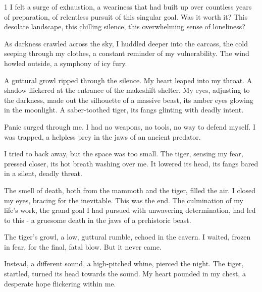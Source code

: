 \documentclass{article}
\newcommand{\baselinezs}{{\sc E2E$_{ZS}$}}
\begin{document}
\begin{tcolorbox}[colback=white, colframe=gray!30!white, coltitle=black, parskip=5mm, title=
    \textbf{System output: \baselinezs}, breakable]
\begin{spacing}{1}
I felt a surge of exhaustion, a weariness that had built up over countless years of preparation, of relentless pursuit of this singular goal. Was it worth it? This desolate landscape, this chilling silence, this overwhelming sense of loneliness?\\\par

As darkness crawled across the sky, I huddled deeper into the carcass, the cold seeping through my clothes, a constant reminder of my vulnerability. The wind howled outside, a symphony of icy fury.\\\par

A guttural growl ripped through the silence. My heart leaped into my throat. A shadow flickered at the entrance of the makeshift shelter. My eyes, adjusting to the darkness, made out the silhouette of a massive beast, its amber eyes glowing in the moonlight. A saber-toothed tiger, its fangs glinting with deadly intent.\\\par

Panic surged through me. I had no weapons, no tools, no way to defend myself. I was trapped, a helpless prey in the jaws of an ancient predator.\\\par

I tried to back away, but the space was too small. The tiger, sensing my fear, pressed closer, its hot breath washing over me. It lowered its head, its fangs bared in a silent, deadly threat.\\\par

The smell of death, both from the mammoth and the tiger, filled the air. I closed my eyes, bracing for the inevitable. This was the end. The culmination of my life's work, the grand goal I had pursued with unwavering determination, had led to this - a gruesome death in the jaws of a prehistoric beast.\\\par

The tiger's growl, a low, guttural rumble, echoed in the cavern. I waited, frozen in fear, for the final, fatal blow. But it never came.\\\par

Instead, a different sound, a high-pitched whine, pierced the night. The tiger, startled, turned its head towards the sound. My heart pounded in my chest, a desperate hope flickering within me.\\\par


\end{spacing}
\end{tcolorbox}
\end{document}
